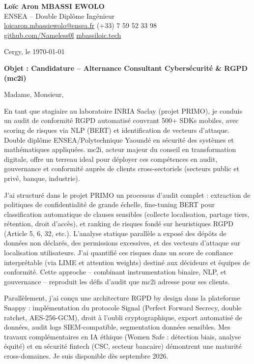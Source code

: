 \documentclass[a4paper,11pt]{article}
\begin{document}
\noindent \textbf{Lo\"ic Aron MBASSI EWOLO} \\
ENSEA -- Double Dipl\^ome Ing\'enieur \\
\href{mailto:loicaron.mbassiewolo@ensea.fr}{loicaron.mbassiewolo@ensea.fr} \quad (+33) 7 59 52 33 98 \\
\href{https://github.com/Nameless0l}{github.com/Nameless0l} \quad \href{https://mbassiloic.tech}{mbassiloic.tech}

\vspace{1em}
\noindent Cergy, le \today

\vspace{1em}
\noindent \textbf{Objet : Candidature -- Alternance Consultant Cybersécurité \& RGPD (mc2i)}

\vspace{1.5em}
\noindent Madame, Monsieur,

\vspace{0.8em}
\noindent En tant que stagiaire au laboratoire INRIA Saclay (projet PRIMO), je conduis un audit de conformité RGPD automatisé couvrant 500+ SDKs mobiles, avec scoring de risques via NLP (BERT) et identification de vecteurs d'attaque. Double diplôme ENSEA/Polytechnique Yaoundé en sécurité des systèmes et mathématiques appliquées. mc2i, acteur majeur du conseil en transformation digitale, offre un terreau ideal pour déployer ces compétences en audit, gouvernance et conformité auprès de clients cross-sectoriels (secteurs public et privé, banque, industrie).

\vspace{0.8em}
\noindent J'ai structuré dans le projet PRIMO un processus d'audit complet : extraction de politiques de confidentialité de grande échelle, fine-tuning BERT pour classification automatique de clauses sensibles (collecte localisation, partage tiers, rétention, droit d'accès), et ranking de risques fondé sur heuristiques RGPD (Article 5, 6, 32, etc.). L'analyse statique parallèle a exposé des dépôts de données non déclarés, des permissions excessives, et des vecteurs d'attaque sur localisation utilisateurs. J'ai quantifié ces risques dans un score de confiance interprétable (via LIME et attention weights) destiné aux décideurs et équipes de conformité. Cette approche -- combinant instrumentation binaire, NLP, et gouvernance -- reproduit les défis d'audit que mc2i adresse pour ses clients.

\vspace{0.8em}
\noindent Parallèlement, j'ai conçu une architecture RGPD by design dans la plateforme Snappy : implémentation du protocole Signal (Perfect Forward Secrecy, double ratchet, AES-256-GCM), droit à l'oubli cryptographique, export automatisé de données, audit logs SIEM-compatible, segmentation données sensibles. Mes travaux complémentaires en IA éthique (Women Safe : détection biais, analyse équité) et en sécurité fintech (CSC, secteur bancaire) démontrent une maturité cross-domaines. Je suis disponible dès septembre 2026.
\end{document}
